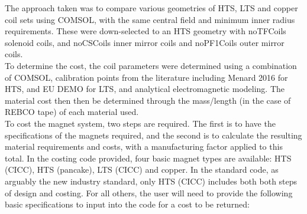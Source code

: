 The approach taken was to compare various geometries of HTS, LTS and copper coil sets using COMSOL, with the same central field and minimum inner radius requirements. These were down-selected to an HTS geometry with noTFCoils solenoid coils, and noCSCoils inner mirror coils and noPF1Coils outer mirror coils.\\

To determine the cost, the coil parameters were determined using a combination of COMSOL, calibration points from the literature including Menard 2016
for HTS, and EU DEMO for LTS, and analytical electromagnetic modeling. The material cost then then be determined through the mass/length (in the case of REBCO tape) of each material used. \\

To cost the magnet system, two steps are required. The first is to have the specifications of the magnets required, and the second is to calculate the resulting material requirements and costs, with a manufacturing factor applied to this total. In the costing code provided, four basic magnet types are available: HTS (CICC), HTS (pancake), LTS (CICC) and copper. In the standard code, as arguably the new industry standard, only HTS (CICC) includes both both steps of design and costing. For all others, the user will need to provide the following basic specifications to input into the code for a cost to be returned:

